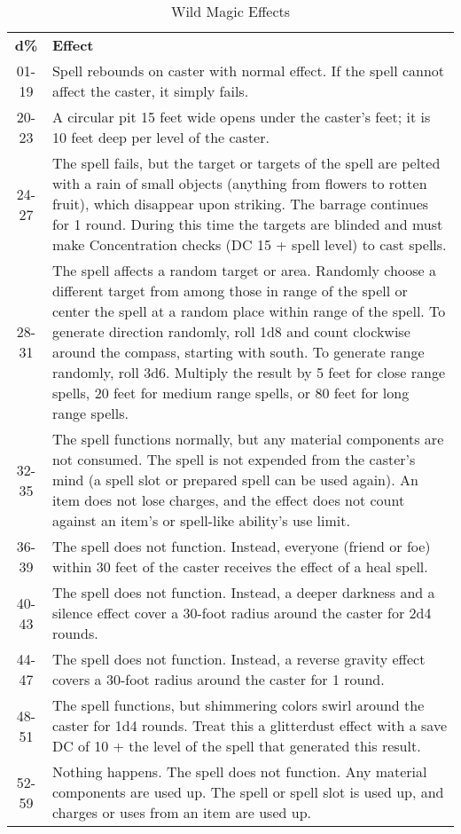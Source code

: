 \begin{table}[htb]
\caption{Wild Magic Effects}
\centering
\begin{tabular}{c p{14cm}}
\textbf{d\%} & \textbf{Effect}\\
01-19 & Spell rebounds on caster with normal effect. If the spell cannot affect the caster, it simply fails.\\
20-23 & A circular pit 15 feet wide opens under the caster's feet; it is 10 feet deep per level of the caster.\\
24-27 & The spell fails, but the target or targets of the spell are pelted with a rain of small objects (anything from flowers to rotten fruit), which disappear upon striking. The barrage continues for 1 round. During this time the targets are blinded and must make Concentration checks (DC 15 + spell level) to cast spells.\\
28-31 & The spell affects a random target or area. Randomly choose a different target from among those in range of the spell or center the spell at a random place within range of the spell. To generate direction randomly, roll 1d8 and count clockwise around the compass, starting with south. To generate range randomly, roll 3d6. Multiply the result by 5 feet for close range spells, 20 feet for medium range spells, or 80 feet for long range spells.\\
32-35 & The spell functions normally, but any material components are not consumed. The spell is not expended from the caster's mind (a spell slot or prepared spell can be used again). An item does not lose charges, and the effect does not count against an item's or spell-like ability's use limit.\\
36-39 & The spell does not function. Instead, everyone (friend or foe) within 30 feet of the caster receives the effect of a heal spell.\\
40-43 & The spell does not function. Instead, a deeper darkness and a silence effect cover a 30-foot radius around the caster for 2d4 rounds.\\
44-47 & The spell does not function. Instead, a reverse gravity effect covers a 30-foot radius around the caster for 1 round.\\
48-51 & The spell functions, but shimmering colors swirl around the caster for 1d4 rounds. Treat this a glitterdust effect with a save DC of 10 + the level of the spell that generated this result.\\
52-59 & Nothing happens. The spell does not function. Any material components are used up. The spell or spell slot is used up, and charges or uses from an item are used up.\\

\end{tabular}
\end{table}
